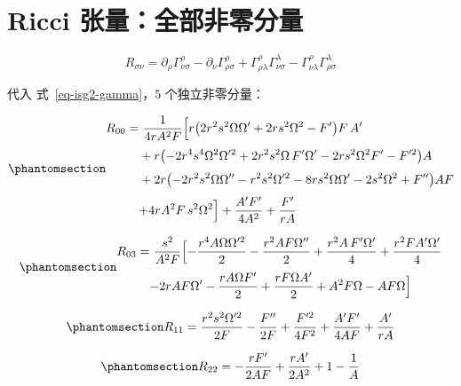 \documentclass[
  chinese,
  a4paper,
  UTF8,
  12pt,
  oneside,
  openany]{ctexbook}
\theoremstyle{plain}
\theoremstyle{plain}
\theoremstyle{plain}
\theoremstyle{definition}
\theoremstyle{plain}
\theoremstyle{plain}
\theoremstyle{remark}
\begin{document}
\section{Ricci 张量：全部非零分量}\label{sec-isg2-ricci}

\[
R_{\sigma\nu}=\partial_\rho\Gamma^{\rho}_{\nu\sigma}
-\partial_\nu\Gamma^{\rho}_{\rho\sigma}
+\Gamma^{\rho}_{\rho\lambda}\Gamma^{\lambda}_{\nu\sigma}
-\Gamma^{\rho}_{\nu\lambda}\Gamma^{\lambda}_{\rho\sigma}
\]

代入 式~\ref{eq-isg2-gamma}，\(5\) 个独立非零分量：

\begin{equation}\protect\phantomsection\label{eq-isg2-R00}{
\begin{aligned}
R_{00}=&\ \frac{1}{4rA^{2}F}\Bigl[
r\bigl(2r^{2}s^{2}\Omega\Omega'+2rs^{2}\Omega^{2}-F'\bigr)F\,A'\Bigr.\\[3pt]
&+r\bigl(-2r^{4}s^{4}\Omega^{2}\Omega'^{2}+2r^{2}s^{2}\Omega\,F'\Omega'-2rs^{2}\Omega^{2}F'-F'^{2}\bigr)A\\[3pt]
&+2r\bigl(-2r^{2}s^{2}\Omega\Omega''-r^{2}s^{2}\Omega'^{2}-8rs^{2}\Omega\Omega'-2s^{2}\Omega^{2}+F''\bigr)AF\\[3pt]
&\Bigl.+4rA^{2}F\,s^{2}\Omega^{2}\Bigr]+\frac{A'F'}{4A^{2}}+\frac{F'}{rA}
\end{aligned}
}\end{equation}

\begin{equation}\protect\phantomsection\label{eq-isg2-R03}{
\begin{aligned}
R_{03}=&\ \frac{s^{2}}{A^{2}F}\Bigl[
-\frac{r^{4}A\Omega\Omega'^{2}}{2}-\frac{r^{2}AF\Omega''}{2}
+\frac{r^{2}A\,F'\Omega'}{4}+\frac{r^{2}F A'\Omega'}{4}\Bigr.\\[3pt]
&\Bigl.-2rAF\Omega'-\frac{rA\Omega F'}{2}+\frac{rF\Omega A'}{2}+A^{2}F\Omega-AF\Omega\Bigr]
\end{aligned}
}\end{equation}

\begin{equation}\protect\phantomsection\label{eq-isg2-R11}{
R_{11}=\frac{r^{2}s^{2}\Omega'^{2}}{2F}-\frac{F''}{2F}+\frac{F'^{2}}{4F^{2}}
+\frac{A'F'}{4AF}+\frac{A'}{rA}
}\end{equation}

\begin{equation}\protect\phantomsection\label{eq-isg2-R22}{
R_{22}=-\frac{rF'}{2AF}+\frac{rA'}{2A^{2}}+1-\frac{1}{A}
}\end{equation}
\end{document}

